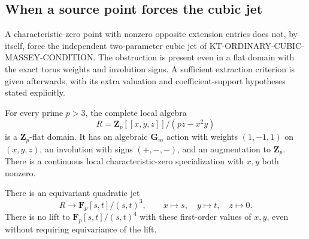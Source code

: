 \subsection{When a source point forces the cubic jet}
\label{sec:kt-source-to-cubic-jet}

A characteristic-zero point with nonzero opposite extension
entries does not, by itself, force the independent two-parameter
cubic jet of KT-ORDINARY-CUBIC-MASSEY-CONDITION.
The obstruction is present even in a flat domain with the exact
torus weights and involution signs.  A sufficient extraction
criterion is given afterwards, with its extra valuation and
coefficient-support hypotheses stated explicitly.

\begin{proposition}
For every prime $p>3$, the complete local algebra
\[
 R=\mathbf Z_p[[x,y,z]]/(pz-x^2y)                         \tag{SJ.1}
\]
is a $\mathbf Z_p$-flat domain.  It has an algebraic
$\mathbf G_m$ action with weights $(1,-1,1)$ on $(x,y,z)$,
an involution with signs $(+,-,-)$, and an augmentation to
$\mathbf Z_p$.  There is a continuous local characteristic-zero
specialization with $x,y$ both nonzero.

There is an equivariant quadratic jet
\[
 R\longrightarrow \mathbf F_p[s,t]/(s,t)^3,\qquad
             x\mapsto s,\quad y\mapsto t,\quad z\mapsto0.
                                                               \tag{SJ.2}
\]
There is no lift to $\mathbf F_p[s,t]/(s,t)^4$ with these
first-order values of $x,y$, even without requiring
equivariance of the lift.
\end{proposition}

